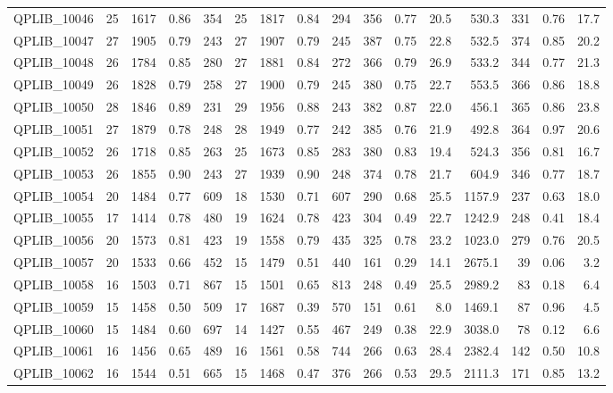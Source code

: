 \documentclass[twoside]{article}
\begin{document}
\begin{longtable}{l|rrrr|rrrr|rrr|rrrr}
		QPLIB\_10046 & 25 & 1617 & 0.86 & 354 & 25 & 1817 & 0.84 & 294 & 356 & 0.77 & 20.5 & 530.3 & 331 & 0.76 & 17.7 \\
		QPLIB\_10047 & 27 & 1905 & 0.79 & 243 & 27 & 1907 & 0.79 & 245 & 387 & 0.75 & 22.8 & 532.5 & 374 & 0.85 & 20.2 \\
		QPLIB\_10048 & 26 & 1784 & 0.85 & 280 & 27 & 1881 & 0.84 & 272 & 366 & 0.79 & 26.9 & 533.2 & 344 & 0.77 & 21.3 \\
		QPLIB\_10049 & 26 & 1828 & 0.79 & 258 & 27 & 1900 & 0.79 & 245 & 380 & 0.75 & 22.7 & 553.5 & 366 & 0.86 & 18.8 \\
		QPLIB\_10050 & 28 & 1846 & 0.89 & 231 & 29 & 1956 & 0.88 & 243 & 382 & 0.87 & 22.0 & 456.1 & 365 & 0.86 & 23.8 \\
		QPLIB\_10051 & 27 & 1879 & 0.78 & 248 & 28 & 1949 & 0.77 & 242 & 385 & 0.76 & 21.9 & 492.8 & 364 & 0.97 & 20.6 \\
		QPLIB\_10052 & 26 & 1718 & 0.85 & 263 & 25 & 1673 & 0.85 & 283 & 380 & 0.83 & 19.4 & 524.3 & 356 & 0.81 & 16.7 \\
		QPLIB\_10053 & 26 & 1855 & 0.90 & 243 & 27 & 1939 & 0.90 & 248 & 374 & 0.78 & 21.7 & 604.9 & 346 & 0.77 & 18.7 \\
		QPLIB\_10054 & 20 & 1484 & 0.77 & 609 & 18 & 1530 & 0.71 & 607 & 290 & 0.68 & 25.5 & 1157.9 & 237 & 0.63 & 18.0 \\
		QPLIB\_10055 & 17 & 1414 & 0.78 & 480 & 19 & 1624 & 0.78 & 423 & 304 & 0.49 & 22.7 & 1242.9 & 248 & 0.41 & 18.4 \\
		QPLIB\_10056 & 20 & 1573 & 0.81 & 423 & 19 & 1558 & 0.79 & 435 & 325 & 0.78 & 23.2 & 1023.0 & 279 & 0.76 & 20.5 \\
		QPLIB\_10057 & 20 & 1533 & 0.66 & 452 & 15 & 1479 & 0.51 & 440 & 161 & 0.29 & 14.1 & 2675.1 & 39 & 0.06 & 3.2 \\
		QPLIB\_10058 & 16 & 1503 & 0.71 & 867 & 15 & 1501 & 0.65 & 813 & 248 & 0.49 & 25.5 & 2989.2 & 83 & 0.18 & 6.4 \\
		QPLIB\_10059 & 15 & 1458 & 0.50 & 509 & 17 & 1687 & 0.39 & 570 & 151 & 0.61 & 8.0 & 1469.1 & 87 & 0.96 & 4.5 \\
		QPLIB\_10060 & 15 & 1484 & 0.60 & 697 & 14 & 1427 & 0.55 & 467 & 249 & 0.38 & 22.9 & 3038.0 & 78 & 0.12 & 6.6 \\
		QPLIB\_10061 & 16 & 1456 & 0.65 & 489 & 16 & 1561 & 0.58 & 744 & 266 & 0.63 & 28.4 & 2382.4 & 142 & 0.50 & 10.8 \\
		QPLIB\_10062 & 16 & 1544 & 0.51 & 665 & 15 & 1468 & 0.47 & 376 & 266 & 0.53 & 29.5 & 2111.3 & 171 & 0.85 & 13.2 \\

\end{longtable}
\end{document}
